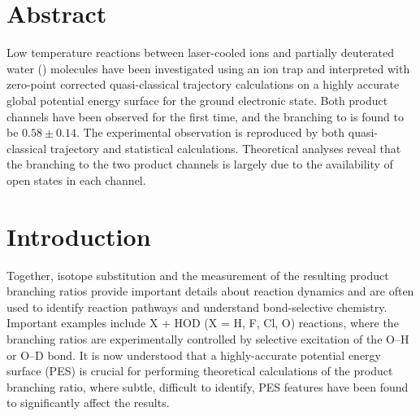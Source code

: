 \section{Abstract}

Low temperature reactions between laser-cooled  ions and partially deuterated water () molecules have been investigated using an ion trap and interpreted with zero-point corrected quasi-classical trajectory calculations on a highly accurate global potential energy surface for the ground electronic state. Both product channels have been observed for the first time, and the branching to  is found to be $0.58 \pm 0.14$. The experimental observation is reproduced by both quasi-classical trajectory and statistical calculations. Theoretical analyses reveal that the branching to the two product channels is largely due to the availability of open states in each channel.

\section{Introduction}

Together, isotope substitution and the measurement of the resulting product branching ratios provide important details about reaction dynamics and are often used to identify reaction pathways and understand bond-selective chemistry.\cite{Crim1990,Crim1996,Zare1998} Important examples include X + HOD (X = H, F, Cl, O) reactions, where the branching ratios are experimentally controlled by selective excitation of the O–H or O–D bond.\cite{Sinha1990,Bronikowski1991,Metz1993a,Zhang1997,Song2015,Song2015a,Fu2015,Zheng2018a,Skouteris1999b} It is now understood that a highly-accurate potential energy surface (PES) is crucial for performing theoretical calculations of the product branching ratio, where subtle, difficult to identify, PES features have been found to significantly affect the results.\cite{Skouteris1999b}

